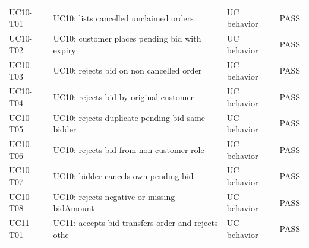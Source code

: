 \begin{table}[t]
\begin{tabular}{p{3.8cm}p{3.6cm}p{2.8cm}p{2.0cm}}
UC10-T01 & UC10: lists cancelled unclaimed orders & UC behavior & PASS \\
UC10-T02 & UC10: customer places pending bid with expiry & UC behavior & PASS \\
UC10-T03 & UC10: rejects bid on non cancelled order & UC behavior & PASS \\
UC10-T04 & UC10: rejects bid by original customer & UC behavior & PASS \\
UC10-T05 & UC10: rejects duplicate pending bid same bidder & UC behavior & PASS \\
UC10-T06 & UC10: rejects bid from non customer role & UC behavior & PASS \\
UC10-T07 & UC10: bidder cancels own pending bid & UC behavior & PASS \\
UC10-T08 & UC10: rejects negative or missing bidAmount & UC behavior & PASS \\
UC11-T01 & UC11: accepts bid transfers order and rejects othe & UC behavior & PASS \\
\bottomrule
\end{tabular}
\end{table}

